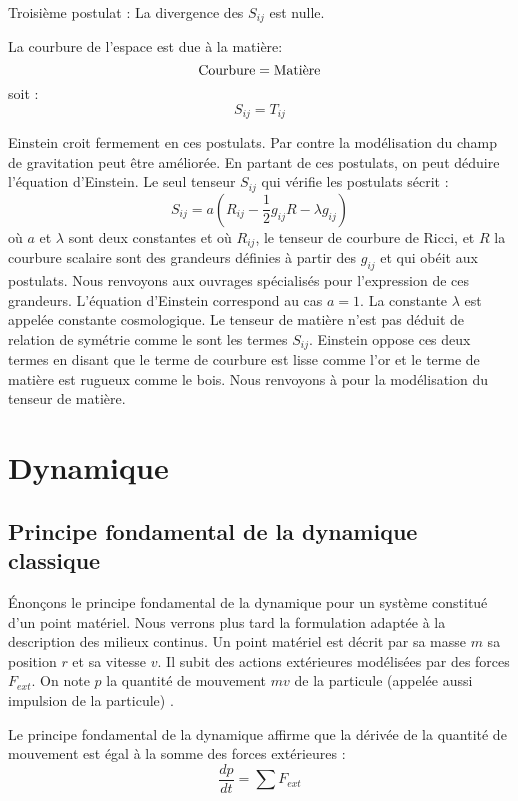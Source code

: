 \documentclass[12pt]{book}
\begin{document}
\begin{postulat}
Troisi\`eme postulat :
La divergence des $S_{ij}$ est nulle.
\end{postulat}
\begin{postulat}
La courbure de l'espace est due \`a la mati\`ere:
\begin{equation}
{\rm Courbure}={\rm Mati\grave ere}
\end{equation}
soit :
\begin{equation}
S_{ij}=T_{ij}
\end{equation}
\end{postulat}
Einstein croit fermement en ces postulats. Par contre la mod\'elisation
du champ de gravitation peut \^etre am\'elior\'ee.
En partant de ces postulats, on peut d\'eduire l'\'equation d'Einstein.
Le seul tenseur $S_{ij}$ qui v\'erifie les postulats s\'ecrit :
\begin{equation}
S_{ij}=a(R_{ij}-\frac{1}{2}g_{ij}R-\lambda g_{ij})
\end{equation}
o\`u $a$ et $\lambda$ sont deux constantes et o\`u $R_{ij}$, le
tenseur de courbure de Ricci, et $R$ la courbure scalaire
sont des grandeurs d\'efinies \`a partir des $g_{ij}$ et qui ob\'eit
aux postulats.
Nous renvoyons aux ouvrages sp\'ecialis\'es pour l'expression de ces
grandeurs.
L'\'equation d'Einstein correspond au cas $a=1$. La constante
$\lambda$ est appel\'ee constante cosmologique.
Le tenseur de mati\`ere n'est pas d\'eduit de relation de sym\'etrie
comme le sont les termes $S_{ij}$. Einstein oppose ces deux termes en
disant que le terme de courbure est lisse comme l'or et le terme de
mati\`ere est rugueux comme le bois. Nous renvoyons \`a
\cite{ph:relat:Hakim94,ph:relat:Charon63} pour la mod\'elisation du tenseur de
mati\`ere.

\section{Dynamique}
\subsection{Principe fondamental de la dynamique classique}
\'Enon\c cons le principe fondamental de la dynamique pour un
syst\`eme constitu\'e d'un point mat\'eriel. Nous verrons plus tard la
formulation adapt\'ee \`a la description des milieux continus. Un
point mat\'eriel est d\'ecrit par sa masse $m$ sa position $r$ et sa
vitesse $v$. Il subit des actions ext\'erieures mod\'elis\'ees par des
forces $F_{ext}$. On note $p$ la quantit\'e de mouvement $mv$
de la
particule (appel\'ee aussi impulsion de la particule) .
\begin{prin}
Le principe fondamental de la dynamique affirme que la d\'eriv\'ee de
la quantit\'e de mouvement est \'egal \`a la somme des forces
ext\'erieures :
\begin{equation}
\frac{dp}{dt}=\sum F_{ext}
\end{equation}
\end{prin}
\end{document}
